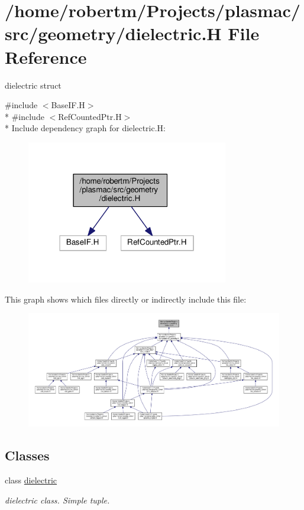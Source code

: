 \hypertarget{dielectric_8H}{}\section{/home/robertm/\+Projects/plasmac/src/geometry/dielectric.H File Reference}
\label{dielectric_8H}


dielectric struct  


{\ttfamily \#include $<$Base\+I\+F.\+H$>$}\\*
{\ttfamily \#include $<$Ref\+Counted\+Ptr.\+H$>$}\\*
Include dependency graph for dielectric.\+H\+:\nopagebreak
\begin{figure}[H]
\begin{center}
\leavevmode
\includegraphics[width=250pt]{dielectric_8H__incl}
\end{center}
\end{figure}
This graph shows which files directly or indirectly include this file\+:\nopagebreak
\begin{figure}[H]
\begin{center}
\leavevmode
\includegraphics[width=350pt]{dielectric_8H__dep__incl}
\end{center}
\end{figure}
\subsection*{Classes}
\begin{DoxyCompactItemize}
\item 
class \hyperlink{classdielectric}{dielectric}
\begin{DoxyCompactList}\small\item\em dielectric class. Simple tuple. \end{DoxyCompactList}\end{DoxyCompactItemize}


